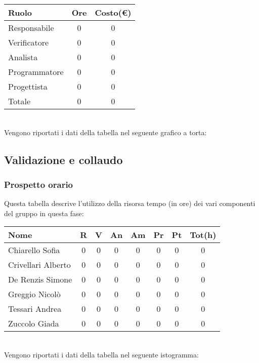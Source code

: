 \begin{tabular}{|l|c|c|}
\hline
Ruolo & Ore & Costo(€)\\
\hline
Responsabile & 0 & 0\\
Verificatore & 0 & 0\\
Analista & 0 & 0\\
Programmatore & 0 & 0\\
Progettista & 0 & 0\\
Totale & 0& 0\\
\hline
\end{tabular}\\


Vengono riportati i dati della tabella nel seguente grafico a torta: \\




\subsection{Validazione e collaudo}

\subsubsection{Prospetto orario}
Questa tabella descrive l'utilizzo della risorsa tempo (in ore) dei vari componenti del gruppo in questa fase: \\

\begin{tabular}{|l|cccccc|c|}
\hline
Nome & R &  V & An & Am & Pr & Pt & Tot(h)\\
\hline
Chiarello Sofia & 0 & 0 & 0 & 0 & 0 & 0 & 0\\
Crivellari Alberto & 0 & 0 & 0 & 0 & 0 & 0 & 0\\
De Renzis Simone & 0 & 0 & 0 & 0 & 0 & 0 & 0\\
Greggio Nicolò & 0 & 0 & 0 & 0 & 0 & 0 & 0\\
Tessari Andrea & 0 & 0 & 0 & 0 & 0 & 0 & 0\\
Zuccolo Giada & 0 & 0 & 0 & 0 & 0 & 0 & 0\\
\hline
\end{tabular}
\\
Vengono riportati i dati della tabella nel seguente istogramma: \\

